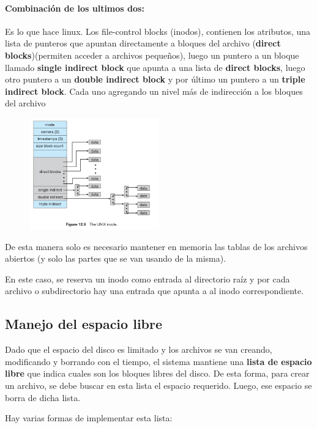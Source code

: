 \paragraph{Combinación de los ultimos dos:} Es lo que hace linux. Los file-control blocks (inodos), contienen los atributos, una lista de punteros que apuntan directamente a bloques del archivo (\textbf{direct blocks})(permiten acceder a archivos pequeños), luego un puntero a un bloque llamado \textbf{single indirect block} que apunta a una lista de \textbf{direct blocks}, luego otro puntero a un \textbf{double indirect block} y por último un puntero a un \textbf{triple indirect block}. Cada uno agregando un nivel más de indirección a los bloques del archivo

	\begin{figure}[h]
		\centering
		\includegraphics[width=0.5\textwidth]{imagenes/inodos}
		\caption{}
		\label{fig:inodos}
	\end{figure}

De esta manera solo es necesario mantener en memoria las tablas de los archivos abiertos (y solo las partes que se van usando de la misma).

En este caso, se reserva un inodo como entrada al directorio raíz y por cada archivo o subdirectorio hay una entrada que apunta a al inodo correspondiente.

\subsection{Manejo del espacio libre}
Dado que el espacio del disco es limitado y los archivos se van creando, modificando y borrando con el tiempo, el sistema mantiene una \textbf{lista de espacio libre} que indica cuales son los bloques libres del disco. De esta forma, para crear un archivo, se debe buscar en esta lista el espacio requerido. Luego, ese espacio se borra de dicha lista.

Hay varias formas de implementar esta lista:

